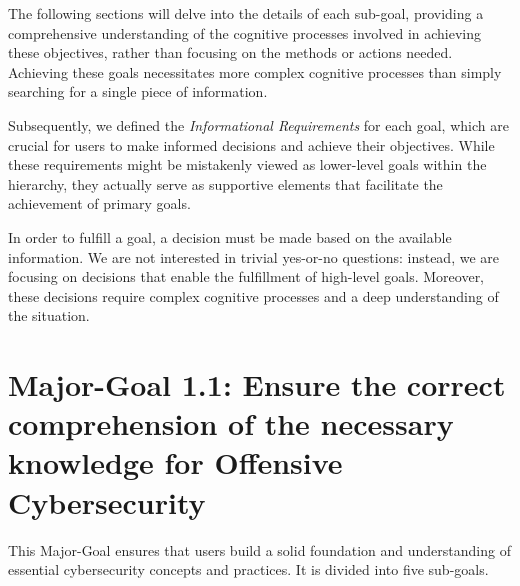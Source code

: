 The following sections will delve into the details of each sub-goal, providing a comprehensive understanding of the cognitive processes involved in achieving these objectives, rather than focusing on the methods or actions needed.
Achieving these goals necessitates more complex cognitive processes than simply searching for a single piece of information.

Subsequently, we defined the \textit{Informational Requirements} for each goal, which are crucial for users to make informed decisions and achieve their objectives. While these requirements might be mistakenly viewed as lower-level goals within the hierarchy, they actually serve as supportive elements that facilitate the achievement of primary goals.

In order to fulfill a goal, a decision must be made based on the available information. We are not interested in trivial yes-or-no questions: instead, we are focusing on decisions that enable the fulfillment of high-level goals. Moreover, these decisions require complex cognitive processes and a deep understanding of the situation.

\newpage
\section{Major-Goal 1.1: Ensure the correct comprehension of the necessary knowledge for Offensive Cybersecurity}
This Major-Goal ensures that users build a solid foundation and understanding of essential cybersecurity concepts and practices. It is divided into five sub-goals.

